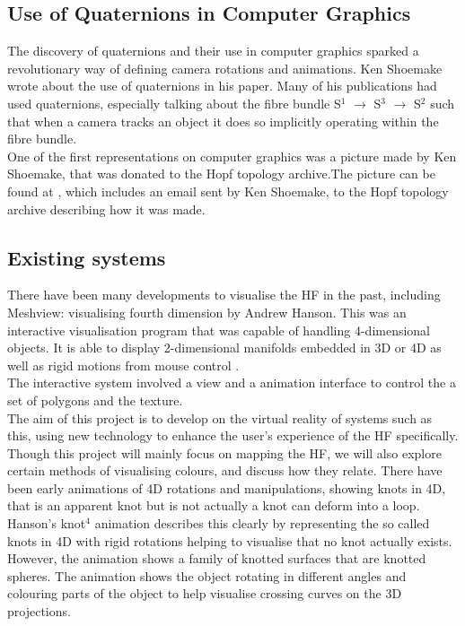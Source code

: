 \documentclass[12pt]{article} %
\begin{document}
\begin{flushleft}
\subsection{Use of Quaternions in Computer Graphics} %
The discovery of quaternions and their use in computer graphics sparked a revolutionary way of defining camera rotations and animations. Ken Shoemake \cite{Ken:anime} wrote about the use of quaternions in his paper. Many of his publications had used quaternions, especially talking about the fibre bundle S$^{1}$ $\rightarrow$ S$^{3}$ $\rightarrow$ S$^{2}$ such that when a camera tracks an object it does so implicitly operating within the fibre bundle.\\
One of the first representations on computer graphics was a picture made by Ken Shoemake, that was donated to the Hopf topology archive.The picture can be found at \cite{Ken:pic}, which includes an email sent by Ken Shoemake, to the Hopf topology archive describing how it was made.\\

\subsection{Existing systems} %
There have been many developments to visualise the HF in the past, including Meshview: visualising fourth dimension by Andrew Hanson. This was an interactive visualisation program that was capable of handling 4-dimensional objects. It is able to display 2-dimensional manifolds embedded in 3D or 4D as well as rigid motions from mouse control \cite{Hanson:1999}.\\
The interactive system involved a view and a animation interface to control the a set of polygons and the texture.\\
The aim of this project is to develop on the virtual reality of systems such as this, using new technology to enhance the user's experience of the HF specifically. Though this project will mainly focus on mapping the HF, we will also explore certain methods of visualising colours, and discuss how they relate.
There have been early animations of 4D rotations and manipulations, showing knots in 4D, that is an apparent knot but is not actually a knot can deform into a loop. Hanson's knot$^{4}$ animation \cite{Hanson:vid} describes this clearly by representing the so called knots in 4D with rigid rotations helping to visualise that no knot actually exists. However, the animation shows a family of knotted surfaces that are knotted spheres. The animation shows the object rotating in different angles and colouring parts of the object to help visualise crossing curves on the 3D projections.

\end{flushleft}
\end{document}
